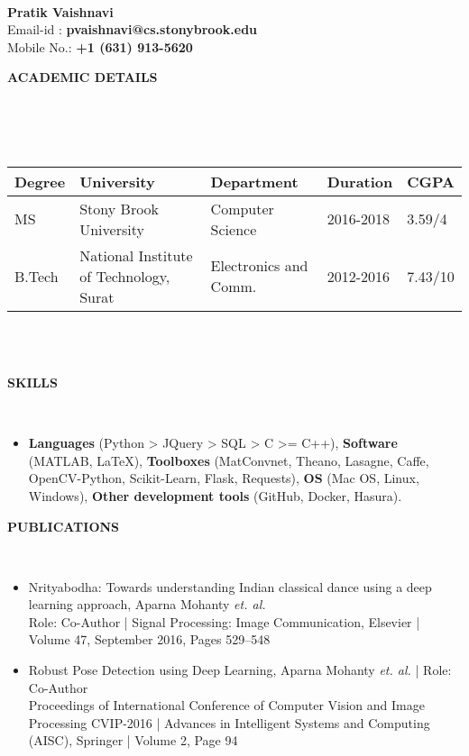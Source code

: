 \documentclass[a4paper]{article}
\newcommand{\lsep}{-0.5cm}
\newcommand{\resheading}[1]{{\small \colorbox{mygrey}{\begin{minipage}{0.975\textwidth}{\textbf{#1 \vphantom{p\^{E}}}}\end{minipage}}}}
\begin{document}
\hspace{0.5cm}\\[-0.2cm]

\textbf{Pratik Vaishnavi} \\
\indent Email-id : \textbf{pvaishnavi@cs.stonybrook.edu} \\
\indent Mobile No.: \textbf{+1 (631) 913-5620} \\

\resheading{\textbf{ACADEMIC DETAILS} }\\[\lsep]
\\ \\
\indent \begin{tabular}{ l @{\hskip 0.55in} l @{\hskip 0.55in} l @{\hskip 0.55in} l @{\hskip 0.55in} l }
\hline
\textbf{Degree} & \textbf{University} & \textbf{Department} & \textbf{Duration} & \textbf{CGPA} \\
\hline
MS & Stony Brook University & Computer Science & 2016-2018 & 3.59/4 \\
B.Tech & National Institute of Technology, Surat & Electronics and Comm. & 2012-2016 & 7.43/10\\
\hline
\end{tabular}
\\ \\

\resheading{\textbf{SKILLS} }\\[\lsep]
\begin{itemize}
\item \noindent \textbf{Languages} (Python > JQuery > SQL > C >= C++),  \textbf{Software} (MATLAB, LaTeX), \textbf{Toolboxes} (MatConvnet, Theano, Lasagne, Caffe, OpenCV-Python, Scikit-Learn, Flask, Requests), \textbf{OS} (Mac OS, Linux, Windows), \textbf{Other development tools} (GitHub, Docker, Hasura).
\end{itemize}

\resheading{\textbf{PUBLICATIONS} }\\[\lsep]
\begin{itemize}
\item \noindent Nrityabodha: Towards understanding Indian classical dance using a deep learning approach, Aparna Mohanty \textit{et. al.}\\Role: Co-Author | Signal Processing: Image Communication, Elsevier | Volume 47, September 2016, Pages 529–548
\item \noindent Robust Pose Detection using Deep Learning, Aparna Mohanty \textit{et. al.} | Role: Co-Author\\
 Proceedings of International Conference of Computer Vision and Image Processing CVIP-2016 | Advances in Intelligent Systems and Computing (AISC), Springer | Volume 2, Page 94
\end{itemize}
\end{document}

